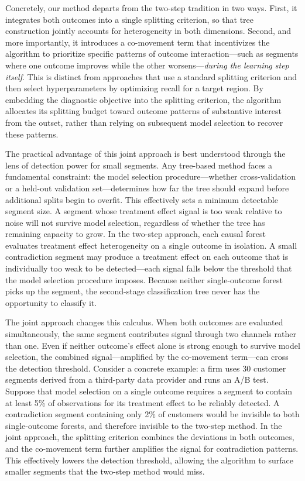 \documentclass[11pt,letterpaper,english]{article}
\theoremstyle{definition}
\theoremstyle{definition}
\begin{document}
\begin{bibunit}
Concretely, our method departs from the two-step tradition in two ways. First, it integrates both outcomes into a single splitting criterion, so that tree construction jointly accounts for heterogeneity in both dimensions. Second, and more importantly, it introduces a co-movement term that incentivizes the algorithm to prioritize specific patterns of outcome interaction---such as segments where one outcome improves while the other worsens---\emph{during the learning step itself}. This is distinct from approaches that use a standard splitting criterion and then select hyperparameters by optimizing recall for a target region. By embedding the diagnostic objective into the splitting criterion, the algorithm allocates its splitting budget toward outcome patterns of substantive interest from the outset, rather than relying on subsequent model selection to recover these patterns.

The practical advantage of this joint approach is best understood through the lens of detection power for small segments. Any tree-based method faces a fundamental constraint: the model selection procedure---whether cross-validation or a held-out validation set---determines how far the tree should expand before additional splits begin to overfit. This effectively sets a minimum detectable segment size. A segment whose treatment effect signal is too weak relative to noise will not survive model selection, regardless of whether the tree has remaining capacity to grow. In the two-step approach, each causal forest evaluates treatment effect heterogeneity on a single outcome in isolation. A small contradiction segment may produce a treatment effect on each outcome that is individually too weak to be detected---each signal falls below the threshold that the model selection procedure imposes. Because neither single-outcome forest picks up the segment, the second-stage classification tree never has the opportunity to classify it.

The joint approach changes this calculus. When both outcomes are evaluated simultaneously, the same segment contributes signal through two channels rather than one. Even if neither outcome's effect alone is strong enough to survive model selection, the combined signal---amplified by the co-movement term---can cross the detection threshold. Consider a concrete example: a firm uses 30 customer segments derived from a third-party data provider and runs an A/B test. Suppose that model selection on a single outcome requires a segment to contain at least 5\% of observations for its treatment effect to be reliably detected. A contradiction segment containing only 2\% of customers would be invisible to both single-outcome forests, and therefore invisible to the two-step method. In the joint approach, the splitting criterion combines the deviations in both outcomes, and the co-movement term further amplifies the signal for contradiction patterns. This effectively lowers the detection threshold, allowing the algorithm to surface smaller segments that the two-step method would miss.


\end{bibunit}
\end{document}

